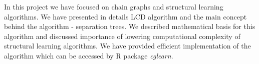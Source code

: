 %
%


In this project we have focused on chain graphs and structural learning algorithms. 
We have presented in details LCD algorithm and the main concept behind the algorithm - separation trees.
We described mathematical basis for this algorithm and discussed importance of lowering computational complexity
of structural learning algorithms.
We have provided efficient implementation of the algorithm which can be accessed by R package \textit{cglearn}.


